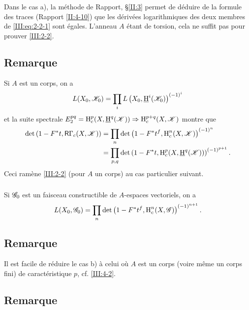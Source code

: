 Dans le cas a), la méthode de Rapport, \S\ref{II:3} permet de déduire de 
la formule des traces (Rapport \ref{II:4-10}) que les dérivées logarithmiques 
des deux membres de \eqref{III:eq:2-2-1} sont égales. L'anneau $A$ étant de 
torsion, cela ne suffit pas pour prouver \ref{III:2-2}. 





\subsection{Remarque}\label{III:2-4}

Si $A$ est un corps, on a 
\[
  L(X_0,\mathscr{K}_0) = \prod_i L\left(X_0,\underline{\operatorname{H}}^i(\mathscr{K}_0)\right)^{(-1)^i}
\]
et la suite spectrale 
$E_2^{p q} = \operatorname{H}_c^p(X,\underline{\operatorname{H}}^q(\mathscr{K}))\Rightarrow \operatorname{H}_c^{p+q}(X,\mathscr{K})$ montre 
que 
\begin{align*}
  \det\left(1-F^* t, \mathsf{R}\Gamma_c(X,\mathscr{K})\right) 
    &= \prod_n \det\left(1-F^* t^f,\operatorname{H}_c^n(X,\mathscr{K})\right)^{(-1)^n} \\
    &= \prod_{p,q} \det\left(1-F^* t,\operatorname{H}_c^p(X,\underline{\operatorname{H}}^q(\mathscr{K}))\right)^{(-1)^{p+1}} \text{.}
\end{align*}
Ceci ramène \ref{III:2-2} (pour $A$ un corps) au cas particulier suivant. 


\subsubsection{}\label{III:2-4-1}

Si $\mathscr{G}_0$ est un faisceau constructible de $A$-espaces vectoriels, on a 
\[
  L(X_0,\mathscr{G}_0) = \prod_n \det\left(1-F^* t^f,\operatorname{H}_c^n(X,\mathscr{G})\right)^{(-1)^{n+1}} \text{.}
\]





\subsection{Remarque}\label{III:2-5}

Il est facile de réduire le cas b) à celui où $A$ est un corps (voire 
même un corps fini) de caractéristique $p$, cf. \ref{III:4-2}. 





\subsection{Remarque}\label{III:2-6}

